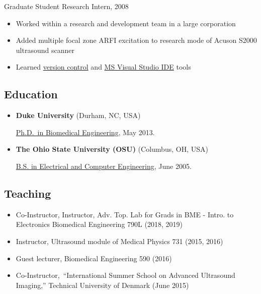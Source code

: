 \documentclass[
]{article}
\providecommand{\tightlist}{%
  \setlength{\itemsep}{0pt}\setlength{\parskip}{0pt}}
\begin{document}
\begin{itemize}
  Graduate Student Research Intern, 2008

  \begin{itemize}
  \tightlist
  \item
    Worked within a research and development team in a large corporation
  \item
    Added multiple focal zone ARFI excitation to research mode of Acuson
    S2000 ultrasound scanner
  \item
    Learned
    \href{http://www-03.ibm.com/software/products/en/clearcase}{version
    control} and \href{http://www.visualstudio.com/}{MS Visual Studio
    IDE} tools
  \end{itemize}
\end{itemize}

\hypertarget{education}{%
\subsection{Education}\label{education}}

\begin{itemize}
\item
  \textbf{Duke University} (Durham, NC, USA)

  \href{http://bme.duke.edu/grad}{Ph.D.~in Biomedical Engineering}, May
  2013.
\item
  \textbf{The Ohio State University (OSU)} (Columbus, OH, USA)

  \href{http://ece.osu.edu/futurestudents/undergrad}{B.S. in Electrical
  and Computer Engineering}, June 2005.
\end{itemize}

\hypertarget{teaching}{%
\subsection{Teaching}\label{teaching}}

\begin{itemize}
\tightlist
\item
  Co-Instructor, Instructor, Adv. Top. Lab for Grads in BME - Intro. to
  Electronics Biomedical Engineering 790L (2018, 2019)
\item
  Instructor, Ultrasound module of Medical Physics 731 (2015, 2016)
\item
  Guest lecturer, Biomedical Engineering 590 (2016)
\item
  Co-Instructor,~``International Summer School on Advanced Ultrasound
  Imaging,'' Technical University of Denmark (June 2015)
\end{itemize}
\end{document}

